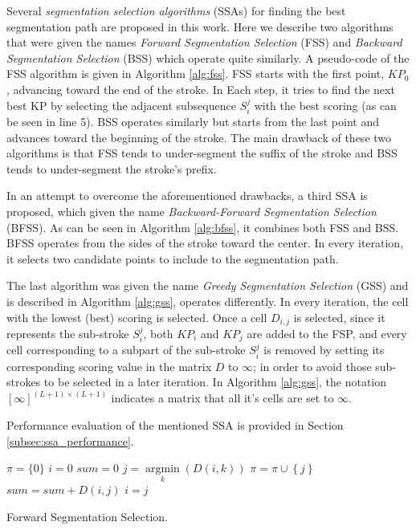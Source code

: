 \documentclass[10pt, conference, compsocconf]{IEEEtran}
\begin{document}
Several \emph{segmentation selection algorithms} (SSAs) for finding the best segmentation path are proposed in this work.
Here we describe two algorithms that were given the names \emph{Forward Segmentation Selection} (FSS) and \emph{Backward Segmentation Selection} (BSS) which operate quite similarly. 
A pseudo-code of the FSS algorithm is given in Algorithm \ref{alg:fss}. 
FSS starts with the first point, $KP_0$, advancing toward the end of the stroke. 
In Each step, it tries to find the next best KP by selecting the adjacent subsequence $S_i^j$ with the best scoring (as can be seen in line 5). 
BSS operates similarly but starts from the last point and advances toward the beginning of the stroke. 
The main drawback of these two algorithms is that FSS tends to under-segment the suffix of the stroke and BSS tends to under-segment the stroke's prefix.

In an attempt to overcome the aforementioned drawbacks, a third SSA is proposed, which given the name \emph{Backward-Forward Segmentation Selection} (BFSS). 
As can be seen in Algorithm \ref{alg:bfss}, it combines both FSS and BSS.
BFSS operates from the sides of the stroke toward the center. In every iteration, it selects two candidate points to include to the segmentation path.

The last algorithm was given the name \emph{Greedy Segmentation Selection} (GSS) and is described in Algorithm \ref{alg:gss}, operates differently.
In every iteration, the cell with the lowest (best) scoring is selected. 
Once a cell $D_{i,j}$ is selected, since it represents the sub-stroke $S_{i}^{j}$, both $KP_{i}$ and $KP_{j}$ are added to the FSP, and every cell corresponding to a subpart of the sub-stroke $S_{i}^{j}$ is removed by setting its corresponding scoring value in the matrix $D$ to $\infty$; in order to avoid those sub-strokes to be selected in a later iteration. In Algorithm \ref{alg:gss}, the notation $[\infty]^{(L+1)\times (L+1)}$ indicates a matrix that all it's cells are set to $\infty$.

Performance evaluation of the mentioned SSA is provided in Section \ref{subsec:ssa_performance}.

\begin{algorithm}
$\pi = \{0\} $\;
$i=0$\;
$sum=0$\;
{
	$j = \mathop {\arg \min }\limits_k \left( {D\left( {i,k} \right)} \right)$\;
	$\pi = \pi \cup \left\{ j \right\}$\;
	$sum = sum + D\left( {i,j} \right)$\;
	$i=j$\;
}
\caption{Forward Segmentation Selection.}
\label{alg:fss}
\end{algorithm}
\end{document}
